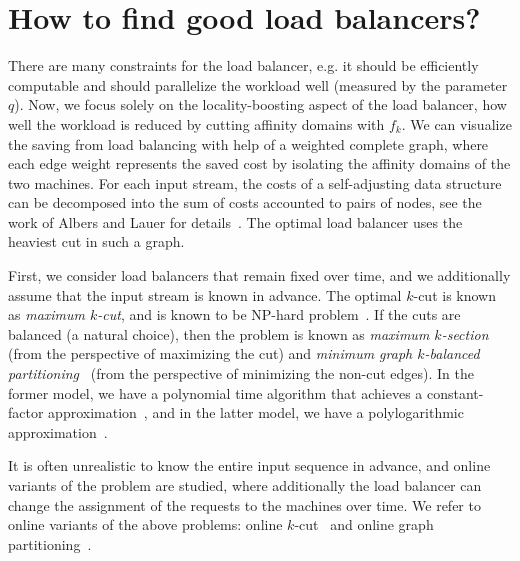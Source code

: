 \section{How to find good load balancers?}
There are many constraints for the load balancer, e.g. it should be efficiently computable and should parallelize the workload well (measured by the parameter $q$).
Now, we focus solely on the locality-boosting aspect of the load balancer, how well the workload is reduced by cutting affinity domains with $f_k$.
We can visualize the saving from load balancing with help of a weighted complete graph, where each edge weight represents the saved cost by isolating the affinity domains of the two machines.
For each input stream, the costs of a self-adjusting data structure can be decomposed into the sum of costs accounted to pairs of nodes, see the work of Albers and Lauer for details~\cite{AlbersL16}.
The optimal load balancer uses the heaviest cut in such a graph.


First, we consider load balancers that remain fixed over time, and we additionally assume that the input stream is known in advance.
The optimal $k$-cut is known as \emph{maximum $k$-cut}, and is known to be NP-hard problem~\cite{Frieze97,Mahajan95}.
If the cuts are balanced (a natural choice), then the problem is known as \emph{maximum $k$-section}~\cite{Andersson99} (from the perspective of maximizing the cut) and \emph{minimum graph $k$-balanced partitioning}~\cite{AndreevR06}  (from the perspective of minimizing the non-cut edges).
In the former model, we have a polynomial time algorithm that achieves a constant-factor approximation~\cite{Andersson99}, and in the latter model, we have a polylogarithmic approximation~\cite{AndreevR06}.

It is often unrealistic to know the entire input sequence in advance, and online variants of the problem are studied, where additionally the load balancer can change the assignment of the requests to the machines over time.
We refer to online variants of the above problems: online $k$-cut~\cite{Bar-NoyL12} and online graph partitioning~\cite{AvinBLPS20}.










